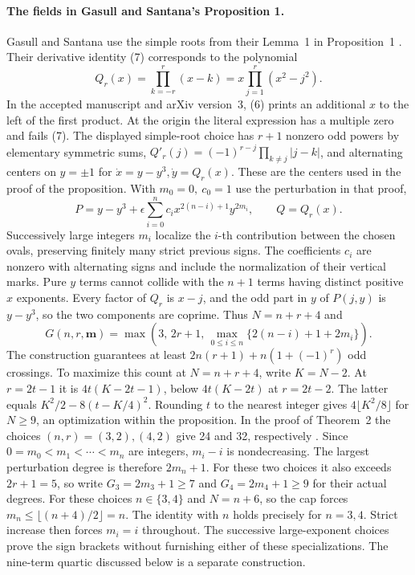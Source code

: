 \paragraph{The fields in Gasull and Santana's Proposition 1.}
Gasull and Santana use the simple roots from their Lemma~1 in Proposition~1 \cite{GasullSantana2024}. Their derivative identity (7) corresponds to the polynomial
\[
 Q_r(x)=\prod_{k=-r}^r(x-k)=x\prod_{j=1}^r(x^2-j^2).
\]
In the accepted manuscript and arXiv version~3, (6) prints an additional \(x\) to the left of the first product. At the origin the literal expression has a multiple zero and fails (7). The displayed simple-root choice has \(r+1\) nonzero odd powers by elementary symmetric sums, \(Q'_r(j)=(-1)^{r-j}\prod_{k\ne j}|j-k|\), and alternating centers on \(y=\pm1\) for \(\dot x=y-y^3,\dot y=Q_r(x)\). These are the centers used in the proof of the proposition. With \(m_0=0,\ c_0=1\) use the perturbation in that proof,
\[
 P=y-y^3+\epsilon\sum_{i=0}^n c_i x^{2(n-i)+1}y^{2m_i},\qquad Q=Q_r(x).
\]
Successively large integers \(m_i\) localize the \(i\)-th contribution between the chosen ovals, preserving finitely many strict previous signs. The coefficients \(c_i\) are nonzero with alternating signs and include the normalization of their vertical marks. Pure \(y\) terms cannot collide with the \(n+1\) terms having distinct positive \(x\) exponents. Every factor of \(Q_r\) is \(x-j\), and the odd part in \(y\) of \(P(j,y)\) is \(y-y^3\), so the two components are coprime. Thus \(N=n+r+4\) and
\[
 G(n,r,\mathbf m)=\max\!\left(3,\,2r+1,\,\max_{0\le i\le n}\{2(n-i)+1+2m_i\}\right).
\]
The construction guarantees at least \(2n(r+1)+n(1+(-1)^r)\) odd crossings. To maximize this count at \(N=n+r+4\), write \(K=N-2\). At \(r=2t-1\) it is \(4t(K-2t-1)\), below \(4t(K-2t)\) at \(r=2t-2\). The latter equals \(K^2/2-8(t-K/4)^2\). Rounding \(t\) to the nearest integer gives \(4\lfloor K^2/8\rfloor\) for \(N\ge9\), an optimization within the proposition. In the proof of Theorem~2 the choices \((n,r)=(3,2),(4,2)\) give 24 and 32, respectively \cite[Proposition~1 and proof of Theorem~2]{GasullSantana2024}. Since \(0=m_0<m_1<\cdots<m_n\) are integers, \(m_i-i\) is nondecreasing. The largest perturbation degree is therefore \(2m_n+1\). For these two choices it also exceeds \(2r+1=5\), so write \(G_3=2m_3+1\ge7\) and \(G_4=2m_4+1\ge9\) for their actual degrees. For these choices \(n\in\{3,4\}\) and \(N=n+6\), so the cap forces \(m_n\le\lfloor(n+4)/2\rfloor=n\). The identity with \(n\) holds precisely for \(n=3,4\). Strict increase then forces \(m_i=i\) throughout. The successive large-exponent choices prove the sign brackets without furnishing either of these specializations. The nine-term quartic discussed below is a separate construction.

